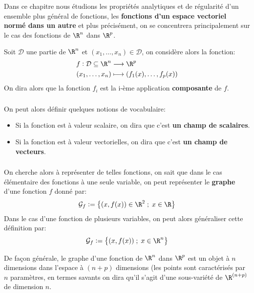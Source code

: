 \chapter*{}

Dans ce chapitre nous étudions les propriétés analytiques et de régularité d'un ensemble plus général de fonctions, les \textbf{fonctions d'un espace vectoriel normé dans un autre} et plus précisément, on se concentrera principalement sur le cas des fonctions de \(\R^n\) dans \(\R^p\).\<

Soit \(\mathcal{D}\) une partie de \(\R^n\) et \((x_1, \ldots, x_n) \in \mathcal{D}\), on considère alors la fonction:
\[
   \begin{aligned}
      f : \mathcal{D} \subseteq \R^n &\longrightarrow \R^p \\
      (x_1, \ldots, x_n) &\longmapsto (f_1(x), \ldots, f_p(x))
   \end{aligned}
\]
On dira alors que la fonction \(f_i\) est la i-ème application \textbf{composante} de \(f\).\+

\subsection*{}
On peut alors définir quelques notions de vocabulaire:
\begin{itemize}
   \item Si la fonction est à valeur scalaire, on dira que c'est \textbf{un champ de scalaires}.
   \item Si la fonction est à valeur vectorielles, on dira que c'est \textbf{un champ de vecteurs}.
\end{itemize}

\subsection*{}
On cherche alors à représenter de telles fonctions, on sait que dans le cas élémentaire des fonctions à une seule variable, on peut représenter le \textbf{graphe} d'une fonction \(f\) donné par:
\[
   \mathcal{G}_f := \bigl\{ (x, f(x)) \in \R^2 \; ; \; x \in \R \bigl\}   
\]
Dans le cas d'une fonction de plusieurs variables, on peut alors généraliser cette définition par:
\[
   \mathcal{G}_f := \bigl\{ (x, f(x)) \; ; \; x \in \R^n \bigl\}  
\]

De façon générale, le graphe d'une fonction de \(\R^n\) dans \(\R^p\) est un objet à \(n\) dimensions dans l'espace à \((n + p)\) dimensions (les points sont caractérisés par \(n\) paramètres, en termes
savants on dira qu'il s'agit d'une sous-variété de \(\R^{(n + p)}\) de dimension \(n\).\<

